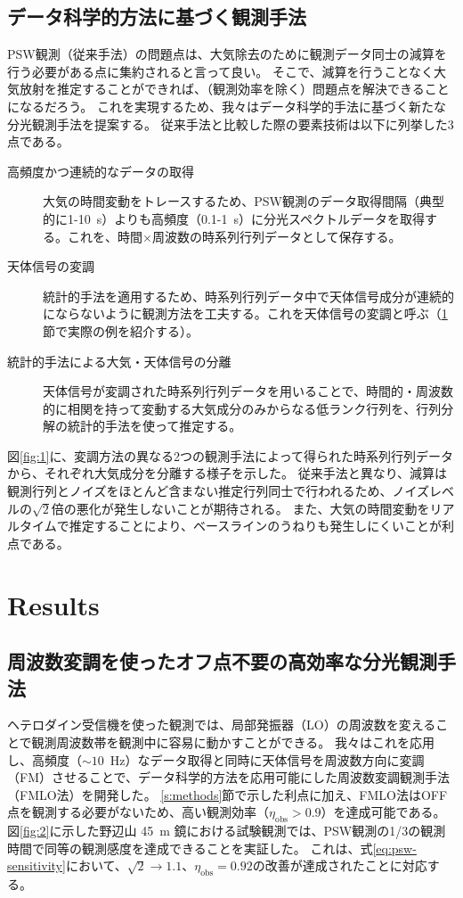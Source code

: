 \documentclass[a4paper,10pt,oneside,twocolumn,notitlepage,final]{jarticle}
\newcommand{\subrm}[1]{_{\mathrm{#1}}}
\begin{document}
\subsection{データ科学的方法に基づく観測手法}

PSW観測（従来手法）の問題点は、大気除去のために観測データ同士の減算を行う必要がある点に集約されると言って良い。
そこで、減算を行うことなく大気放射を推定することができれば、（観測効率を除く）問題点を解決できることになるだろう。
これを実現するため、我々はデータ科学的手法に基づく新たな分光観測手法を提案する。
従来手法と比較した際の要素技術は以下に列挙した3点である。

\begin{description}
    \item[高頻度かつ連続的なデータの取得] 大気の時間変動をトレースするため、PSW観測のデータ取得間隔（典型的に1-10~s）よりも高頻度（0.1-1~s）に分光スペクトルデータを取得する。これを、時間$\times$周波数の時系列行列データとして保存する。
    \item[天体信号の変調] 統計的手法を適用するため、時系列行列データ中で天体信号成分が連続的にならないように観測方法を工夫する。これを天体信号の変調と呼ぶ（\ref{s:results}節で実際の例を紹介する）。
    \item[統計的手法による大気・天体信号の分離] 天体信号が変調された時系列行列データを用いることで、時間的・周波数的に相関を持って変動する大気成分のみからなる低ランク行列を、行列分解の統計的手法を使って推定する。
\end{description}

図\ref{fig:1}に、変調方法の異なる2つの観測手法によって得られた時系列行列データから、それぞれ大気成分を分離する様子を示した。
従来手法と異なり、減算は観測行列とノイズをほとんど含まない推定行列同士で行われるため、ノイズレベルの$\sqrt{2}$倍の悪化が発生しないことが期待される。
また、大気の時間変動をリアルタイムで推定することにより、ベースラインのうねりも発生しにくいことが利点である。

\section{Results}
\label{s:results}

\subsection{周波数変調を使ったオフ点不要の高効率な分光観測手法}

ヘテロダイン受信機を使った観測では、局部発振器（LO）の周波数を変えることで観測周波数帯を観測中に容易に動かすことができる。
我々はこれを応用し、高頻度（$\sim10$~Hz）なデータ取得と同時に天体信号を周波数方向に変調（FM）させることで、データ科学的方法を応用可能にした周波数変調観測手法（FMLO法）を開発した\citep{Taniguchi+20}。
\ref{s:methods}節で示した利点に加え、FMLO法はOFF点を観測する必要がないため、高い観測効率（$\eta\subrm{obs}>0.9$）を達成可能である。
図\ref{fig:2}に示した野辺山 45~m 鏡における試験観測では、PSW観測の1/3の観測時間で同等の観測感度を達成できることを実証した。
これは、式\ref{eq:psw-sensitivity}において、$\sqrt{2}\rightarrow1.1$、$\eta\subrm{obs}=0.92$の改善が達成されたことに対応する。
\end{document}
